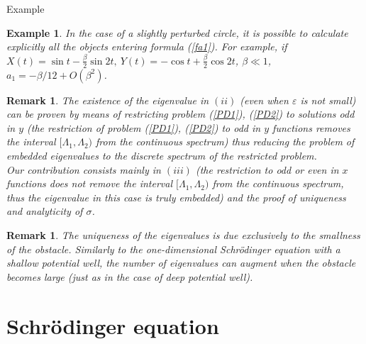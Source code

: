 \documentclass{beamer}
\newtheorem{obs}[teo]{Remark}
\newtheorem{exa}[teo]{Example}
\newcommand{\ds}{\displaystyle}
\begin{document}
\begin{frame}{Example}
\begin{exa}\label{X}
In the case of a slightly perturbed circle, it is possible to calculate explicitly all the objects entering formula (\ref{fa1}). For example, if $X(t)=\sin t-\ds\frac{\beta}{2} \sin 2t,~ Y(t)= -\cos t+\ds\frac{\beta}{2}\cos2t$, $\beta\ll 1$,  $a_1=-\beta/12+O(\beta^2)$.
\end{exa}

\end{frame}
\begin{frame}
\begin{obs}
The existence of the eigenvalue in $(ii)$ (even when $\varepsilon$ is not small) can be proven by means of restricting problem (\ref{PD1}), (\ref{PD2}) to solutions odd in  $y$  (the restriction of problem (\ref{PD1}), (\ref{PD2}) to odd in $y$ functions removes the interval $[\Lambda_1,\Lambda_2)$ from the continuous spectrum) thus reducing the problem of embedded eigenvalues to the discrete spectrum of the restricted problem.\\Our contribution consists mainly in $(iii)$ (the restriction to odd or even in $x$ functions does not remove the interval $[\Lambda_1,\Lambda_2)$ from the continuous spectrum, thus the eigenvalue in this case is truly embedded) and the proof of uniqueness and analyticity of $\sigma$. 
\end{obs}

\begin{obs}
The uniqueness of the eigenvalues is due exclusively to the smallness of the obstacle. Similarly to the one-dimensional Schr\"odinger equation with a shallow potential well, the number of eigenvalues can augment when the obstacle becomes large (just as in the case of deep potential well).
\end{obs}
\end{frame}

\section{Schr\"odinger equation}
\end{document}
